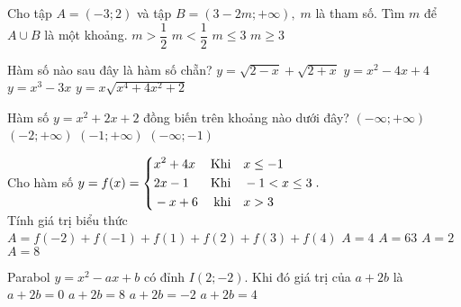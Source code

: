 \begin{ex}%
Cho tập $A=(-3;2)$ và tập $B=(3-2m;+\infty ),\; m$ là tham số. Tìm $m$ để $A\cup B$ là một khoảng.
\choice
{\True $m>\dfrac{1}{2}$}
{$m< \dfrac{1}{2}$}
{$m \le 3$}
{$m \ge 3$}
\end{ex}
\begin{ex}%
Hàm số nào sau đây là hàm số chẵn?
\choice
{\True $y=\sqrt{2-x}+\sqrt{2+x} $}
{$y=x^2-4x+4$}
{$y=x^3-3x$}
{$y=x\sqrt{x^4+4x^2+2}$}
\end{ex}
\begin{ex}%
Hàm số $y=x^2+2x+2$ đồng biến trên khoảng nào dưới đây?
\choice
{$(-\infty; + \infty ) $}
{$(-2;+\infty ) $}
{\True $\left( -1; + \infty \right) $}
{$(-\infty; -1 ) $}
\end{ex}
\begin{ex}%
Cho hàm số $y=f(x)=\left\{\begin{aligned}&x^2+4x &\text{Khi} \quad & x\le -1\\ &2x-1& \text{Khi} \quad & -1<x \le 3 \\ & -x+6& \text{khi} \quad& x>3\end{aligned}\right..$\\
Tính giá trị biểu thức $A=f(-2)+f(-1)+f(1)+f(2) + f(3) +f(4)$
\choice
{\True $A=4$}
{$A=63$}
{$A=2$}
{$A=8$}
\end{ex}
\begin{ex}%
Parabol $y=x^2-ax+b$ có đỉnh $I(2;-2)$. Khi đó giá trị của $a+2b$ là
\choice
{$a+2b=0$}
{\True $a+2b=8$}
{$a+2b=-2$}
{$a+2b=4$}
\end{ex}
